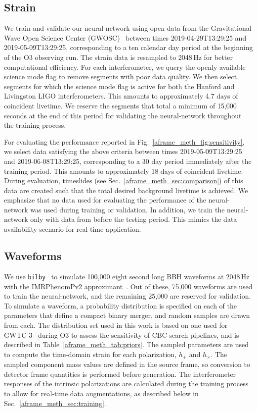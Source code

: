 \begin{refsection}
\subsection{Strain}
We train and validate our neural-network using open data from the Gravitational Wave Open Science Center (GWOSC)~\cite{Abbott_2023_open_data} between times 2019-04-29T13:29:25 and 2019-05-09T13:29:25, corresponding to a ten calendar day period at the beginning of the O3 observing run. 
The strain data is resampled to 2048\,Hz for better computational efficiency. 
For each interferometer, we query the openly available science mode flag to remove segments with poor data quality. 
We then select segments for which the science mode flag is active for both the Hanford and Livingston LIGO interferometers. 
This amounts to approximately 4.7 days of coincident livetime. 
We reserve the segments that total a minimum of 15,000 seconds at the end of this period for validating the neural-network throughout the training process.

For evaluating the performance reported in Fig.~\ref{aframe_meth_fig:sensitivity}, we select data satisfying the above criteria between times 2019-05-09T13:29:25 and 2019-06-08T13:29:25, corresponding to a 30 day period immediately after the training period. 
This amounts to approximately 18 days of coincident livetime.
During evaluation, timeslides (see Sec.~\ref{aframe_meth_sec:comparison}) of this data are created such that the total desired background livetime is achieved. 
We emphasize that no data used for evaluating the performance of the neural-network was used during training or validation. 
In addition, we train the neural-network only with data from before the testing period. This mimics the data availability scenario for real-time application. 

\subsection{Waveforms} 
We use \texttt{bilby}~\cite{Ashton_2019} to simulate 100,000 eight second long BBH waveforms at 2048\,Hz with the IMRPhenomPv2 approximant~\cite{PhysRevLett.113.151101}. 
Out of these, 75,000 waveforms are used to train the neural-network, and the remaining 25,000 are reserved for validation. 
To simulate a waveform, a probability distribution is specified on each of the parameters that define a compact binary merger, and random samples are drawn from each.
The distribution set used in this work is based on one used for GWTC-3~\cite{gwtc-3-astro} during O3 to assess the sensitivity of CBC search pipelines, and is described in Table~\ref{aframe_meth_tab:priors}. 
The sampled parameters are used to compute the time-domain strain for each polarization, $h_+$ and $h_\times$. 
The sampled component mass values are defined in the source frame, so conversion to detector frame quantities is performed before generation.
The interferometer responses of the intrinsic polarizations are calculated during the training process to allow for real-time data augmentations, as described below in Sec.~\ref{aframe_meth_sec:training}.


\end{refsection}
